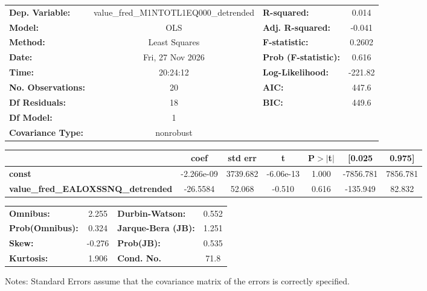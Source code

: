\begin{center}
\begin{tabular}{lclc}
\toprule
\textbf{Dep. Variable:}                    & value\_fred\_M1NTOTL1EQ000\_detrended & \textbf{  R-squared:         } &     0.014   \\
\textbf{Model:}                            &                  OLS                  & \textbf{  Adj. R-squared:    } &    -0.041   \\
\textbf{Method:}                           &             Least Squares             & \textbf{  F-statistic:       } &    0.2602   \\
\textbf{Date:}                             &            Fri, 27 Nov 2026           & \textbf{  Prob (F-statistic):} &    0.616    \\
\textbf{Time:}                             &                20:24:12               & \textbf{  Log-Likelihood:    } &   -221.82   \\
\textbf{No. Observations:}                 &                     20                & \textbf{  AIC:               } &     447.6   \\
\textbf{Df Residuals:}                     &                     18                & \textbf{  BIC:               } &     449.6   \\
\textbf{Df Model:}                         &                      1                & \textbf{                     } &             \\
\textbf{Covariance Type:}                  &               nonrobust               & \textbf{                     } &             \\
\bottomrule
\end{tabular}
\begin{tabular}{lcccccc}
                                           & \textbf{coef} & \textbf{std err} & \textbf{t} & \textbf{P$> |$t$|$} & \textbf{[0.025} & \textbf{0.975]}  \\
\midrule
\textbf{const}                             &   -2.266e-09  &     3739.682     & -6.06e-13  &         1.000        &    -7856.781    &     7856.781     \\
\textbf{value\_fred\_EALOXSSNQ\_detrended} &     -26.5584  &       52.068     &    -0.510  &         0.616        &     -135.949    &       82.832     \\
\bottomrule
\end{tabular}
\begin{tabular}{lclc}
\textbf{Omnibus:}       &  2.255 & \textbf{  Durbin-Watson:     } &    0.552  \\
\textbf{Prob(Omnibus):} &  0.324 & \textbf{  Jarque-Bera (JB):  } &    1.251  \\
\textbf{Skew:}          & -0.276 & \textbf{  Prob(JB):          } &    0.535  \\
\textbf{Kurtosis:}      &  1.906 & \textbf{  Cond. No.          } &     71.8  \\
\bottomrule
\end{tabular}
\end{center}

Notes: \newline
 [1] Standard Errors assume that the covariance matrix of the errors is correctly specified.